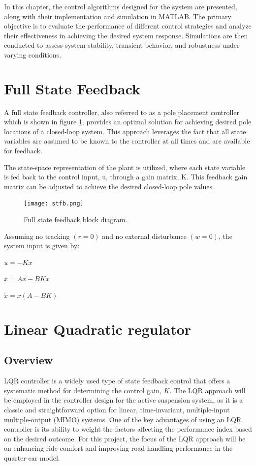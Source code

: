 In this chapter, the control algorithms designed for the system are presented, along with their implementation and simulation in MATLAB. The primary objective is to evaluate the performance of different control strategies and analyze their effectiveness in achieving the desired system response. Simulations are then conducted to assess system stability, transient behavior, and robustness under varying conditions.

\section{Full State Feedback}
A full state feedback controller, also referred to as a pole placement controller which is shown in figure \ref{fig:stfb}, provides an optimal solution for achieving desired pole locations of a closed-loop system. This approach leverages the fact that all state variables are assumed to be known to the controller at all times and are available for feedback.

The state-space representation of the plant is utilized, where each state variable is fed back to the control input, u, through a gain matrix, K. This feedback gain matrix can be adjusted to achieve the desired closed-loop pole values.

\begin{figure}[H]
	\centering
	\texttt{[image: stfb.png]}
	\caption{Full state feedback block diagram. \cite{controltutorials}
	}
	\label{fig:stfb}
\end{figure}

Assuming no tracking $(r=0)$ and no external disturbance $(w=0)$, the system input is given by:

$u = -Kx$

$\dot{x} = Ax - BKx$

$\dot{x} = x(A - BK)$

\newpage
\section{Linear Quadratic regulator}
\subsection{Overview}
LQR controller is a widely used type of state feedback control that offers a systematic method for determining the control gain, $K$. The LQR approach will be employed in the controller design for the active suspension system, as it is a classic and straightforward option for linear, time-invariant, multiple-input multiple-output (MIMO) systems. One of the key advantages of using an LQR controller is its ability to weight the factors affecting the performance index based on the desired outcome. For this project, the focus of the LQR approach will be on enhancing ride comfort and improving road-handling performance in the quarter-car model.

